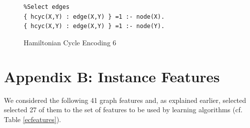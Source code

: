 \documentclass{new_tlp}
\begin{document}
\begin{figure}[!h]
\figrule
\begin{center}
\begin{verbatim}
%Select edges
{ hcyc(X,Y) : edge(X,Y) } =1 :- node(X).
{ hcyc(X,Y) : edge(X,Y) } =1 :- node(Y).
\end{verbatim}
\end{center}
\figrule
\caption{Hamiltonian Cycle Encoding 6}\label{enc6}
\end{figure}

\newpage
\section*{Appendix B: Instance Features}\label{appB}

We considered the following 41 graph features and, as explained earlier, 
selected selected 27 of them to the set of features to be used by learning 
algorithms (cf. Table \ref{ecfeatures}).

\end{document}
